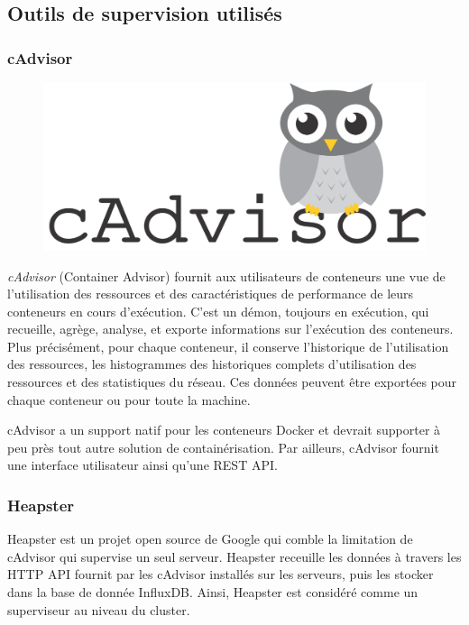 \begin{onehalfspace}
\subsection{Outils de supervision utilisés}


\subsubsection*{cAdvisor}



\begin{figure}
\centering
\includegraphics[scale=0.2]{chapitre5/assets/cadvisor}
\end{figure}
\noindent \emph{cAdvisor} (Container Advisor) fournit aux utilisateurs de conteneurs une vue de l'utilisation des ressources et des caractéristiques de performance de leurs conteneurs en cours d'exécution. C'est un démon, toujours en exécution, qui recueille, agrège, analyse, et exporte informations sur l'exécution des conteneurs. Plus précisément, pour chaque conteneur, il conserve l'historique de l'utilisation des ressources, les histogrammes des historiques complets d'utilisation des ressources et des statistiques du réseau. Ces données peuvent être exportées pour chaque conteneur ou pour toute la machine.

cAdvisor a un support natif pour les conteneurs Docker et devrait supporter à peu près tout autre solution de containérisation. Par ailleurs, cAdvisor fournit une interface utilisateur ainsi qu'une REST API.


\subsubsection*{Heapster}

Heapster est un projet open source de Google qui comble la limitation de cAdvisor qui supervise un seul serveur. Heapster receuille les données à travers les HTTP API fournit par les cAdvisor installés sur les serveurs, puis les stocker dans la base de donnée InfluxDB. Ainsi, Heapster est considéré comme un superviseur au niveau du cluster.


\end{onehalfspace}
